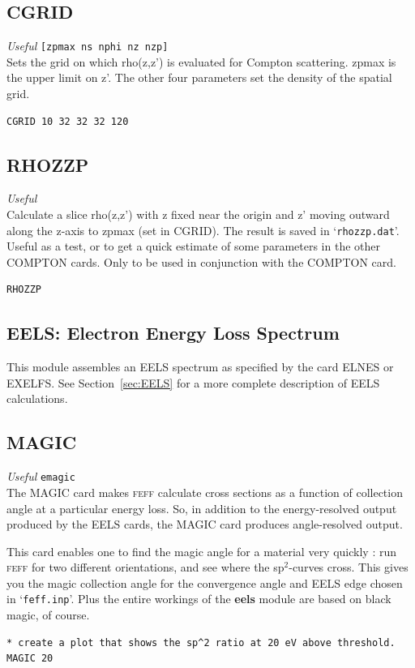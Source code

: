 \documentclass[11pt,oneside]{report} %
\newcommand{\program}[1]{\textsc{#1}}
\newcommand{\feff}{\program{feff}}
\newenvironment{Card}[4]%
      {\vspace{3ex}%
        \subsection{#1}
        \quad\textsl{#3}\newline
        \quad\texttt{#2}\newline%
        \label{card:#4}\\}
      {}
\newcommand{\file}[1]{`\texttt{#1}'}
\newcommand{\module}[1]{\textrm{\bf{#1}}}
\begin{document}
\begin{Card}{CGRID}{[zpmax ns nphi nz nzp]}{Useful}{cgr}
  Sets the grid on which rho(z,z') is evaluated for Compton scattering.  zpmax is the upper limit on z'.  The other four parameters set the density of the spatial grid.
\begin{verbatim}
CGRID 10 32 32 32 120 
\end{verbatim}
\end{Card}

\begin{Card}{RHOZZP}{}{Useful}{rho}
  Calculate a slice rho(z,z') with z fixed near the origin and z' moving outward along the z-axis to zpmax (set in CGRID).  The result is saved in \file{rhozzp.dat}.  Useful as a test, or to get a quick estimate of some parameters in the other COMPTON cards.  Only to be used in conjunction with the COMPTON card.
\begin{verbatim}
RHOZZP
\end{verbatim}
\end{Card}


\subsection{EELS: Electron Energy Loss Spectrum}
\label{sec:Eels-modul}
  This module assembles an EELS spectrum as specified by the card ELNES 
  or EXELFS. See Section~\ref{sec:EELS} for a more complete description of EELS calculations.



\begin{Card}{MAGIC}{emagic}{Useful}{mag}
  The MAGIC card makes {\feff} calculate cross sections as a function of 
  collection angle at a particular energy loss. So, in addition to the 
  energy-resolved output produced by the EELS cards, the MAGIC card produces 
  angle-resolved output.

  This card enables one to 
  find the magic angle for a material very quickly : run {\feff} for two 
  different orientations, and see where the sp$^2$-curves cross. This gives 
  you the magic collection angle for the convergence angle and EELS edge chosen 
  in \file{feff.inp}.  Plus the entire workings of the \module{eels} module are
  based on black magic, of course.

\begin{verbatim}
* create a plot that shows the sp^2 ratio at 20 eV above threshold.
MAGIC 20
\end{verbatim}
\end{Card}
\end{document}
